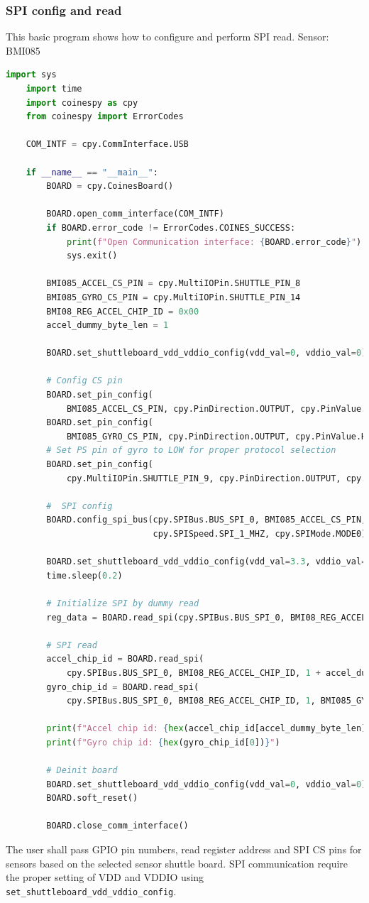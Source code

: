 \documentclass[11pt,headings=small]{scrartcl}
\begin{document}
\subsubsection{SPI config and read}
This basic program shows how to configure and perform SPI read.
\newline Sensor: BMI085
\begin{lstlisting}[language=python]
	import sys
	import time
	import coinespy as cpy
	from coinespy import ErrorCodes
	
	COM_INTF = cpy.CommInterface.USB
	
	if __name__ == "__main__":
		BOARD = cpy.CoinesBoard()

		BOARD.open_comm_interface(COM_INTF)
		if BOARD.error_code != ErrorCodes.COINES_SUCCESS:
			print(f"Open Communication interface: {BOARD.error_code}")
			sys.exit()
	
		BMI085_ACCEL_CS_PIN = cpy.MultiIOPin.SHUTTLE_PIN_8
		BMI085_GYRO_CS_PIN = cpy.MultiIOPin.SHUTTLE_PIN_14
		BMI08_REG_ACCEL_CHIP_ID = 0x00
		accel_dummy_byte_len = 1
	
		BOARD.set_shuttleboard_vdd_vddio_config(vdd_val=0, vddio_val=0)
	
		# Config CS pin
		BOARD.set_pin_config(
			BMI085_ACCEL_CS_PIN, cpy.PinDirection.OUTPUT, cpy.PinValue.HIGH)
		BOARD.set_pin_config(
			BMI085_GYRO_CS_PIN, cpy.PinDirection.OUTPUT, cpy.PinValue.HIGH)
		# Set PS pin of gyro to LOW for proper protocol selection
		BOARD.set_pin_config(
			cpy.MultiIOPin.SHUTTLE_PIN_9, cpy.PinDirection.OUTPUT, cpy.PinValue.LOW)
	
		#  SPI config
		BOARD.config_spi_bus(cpy.SPIBus.BUS_SPI_0, BMI085_ACCEL_CS_PIN,
							 cpy.SPISpeed.SPI_1_MHZ, cpy.SPIMode.MODE0)
	
		BOARD.set_shuttleboard_vdd_vddio_config(vdd_val=3.3, vddio_val=3.3)
		time.sleep(0.2)
	
		# Initialize SPI by dummy read
		reg_data = BOARD.read_spi(cpy.SPIBus.BUS_SPI_0, BMI08_REG_ACCEL_CHIP_ID, 1)
	
		# SPI read
		accel_chip_id = BOARD.read_spi(
			cpy.SPIBus.BUS_SPI_0, BMI08_REG_ACCEL_CHIP_ID, 1 + accel_dummy_byte_len, BMI085_ACCEL_CS_PIN)
		gyro_chip_id = BOARD.read_spi(
			cpy.SPIBus.BUS_SPI_0, BMI08_REG_ACCEL_CHIP_ID, 1, BMI085_GYRO_CS_PIN)
	
		print(f"Accel chip id: {hex(accel_chip_id[accel_dummy_byte_len])}")
		print(f"Gyro chip id: {hex(gyro_chip_id[0])}")
	
		# Deinit board
		BOARD.set_shuttleboard_vdd_vddio_config(vdd_val=0, vddio_val=0)
		BOARD.soft_reset()
	
		BOARD.close_comm_interface()
\end{lstlisting}
The user shall pass GPIO pin numbers, read register address and SPI CS pins for sensors based on the selected sensor shuttle board. SPI communication require the proper setting of VDD and VDDIO using \texttt{set\_shuttleboard\_vdd\_vddio\_config}.
\end{document}
